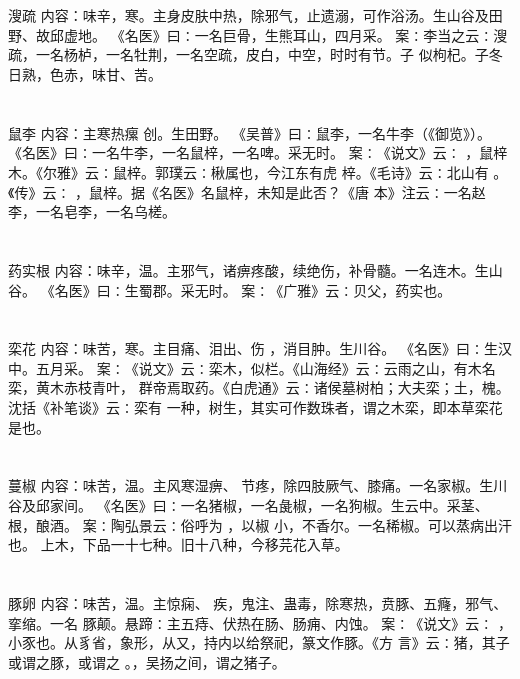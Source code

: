 \documentclass[12pt,UTF8]{ctexbook}
\begin{document}
\section{}溲疏
内容：味辛，寒。主身皮肤中热，除邪气，止遗溺，可作浴汤。生山谷及田野、故邱虚地。 
《名医》曰∶一名巨骨，生熊耳山，四月采。 
案∶李当之云∶溲疏，一名杨栌，一名牡荆，一名空疏，皮白，中空，时时有节。子 
似枸杞。子冬日熟，色赤，味甘、苦。 


\section{}鼠李
内容：主寒热瘰 创。生田野。 
《吴普》曰∶鼠李，一名牛李（《御览》）。 
《名医》曰∶一名牛李，一名鼠梓，一名啤。采无时。 
案∶《说文》云∶ ，鼠梓木。《尔雅》云∶鼠梓。郭璞云∶楸属也，今江东有虎 
梓。《毛诗》云∶北山有 。《传》云∶ ，鼠梓。据《名医》名鼠梓，未知是此否？《唐 
本》注云∶一名赵李，一名皂李，一名乌槎。 


\section{}药实根
内容：味辛，温。主邪气，诸痹疼酸，续绝伤，补骨髓。一名连木。生山谷。 
《名医》曰∶生蜀郡。采无时。 
案∶《广雅》云∶贝父，药实也。 


\section{}栾花
内容：味苦，寒。主目痛、泪出、伤 ，消目肿。生川谷。 
《名医》曰∶生汉中。五月采。 
案∶《说文》云∶栾木，似栏。《山海经》云∶云雨之山，有木名栾，黄木赤枝青叶， 
群帝焉取药。《白虎通》云∶诸侯墓树柏；大夫栾；土，槐。沈括《补笔谈》云∶栾有 
一种，树生，其实可作数珠者，谓之木栾，即本草栾花是也。 


\section{}蔓椒
内容：味苦，温。主风寒湿痹、 节疼，除四肢厥气、膝痛。一名家椒。生川谷及邱家间。 
《名医》曰∶一名猪椒，一名彘椒，一名狗椒。生云中。采茎、根，酿酒。 
案∶陶弘景云∶俗呼为 ，以椒 小，不香尔。一名稀椒。可以蒸病出汗也。 
上木，下品一十七种。旧十八种，今移芫花入草。 


\section{}豚卵
内容：味苦，温。主惊痫、 疾，鬼注、蛊毒，除寒热，贲豚、五癃，邪气、挛缩。一名 
豚颠。悬蹄∶主五痔、伏热在肠、肠痈、内蚀。 
案∶《说文》云∶ ，小豕也。从豸省，象形，从又，持内以给祭祀，篆文作豚。《方 
言》云∶猪，其子或谓之豚，或谓之 。，吴扬之间，谓之猪子。 
\end{document}
